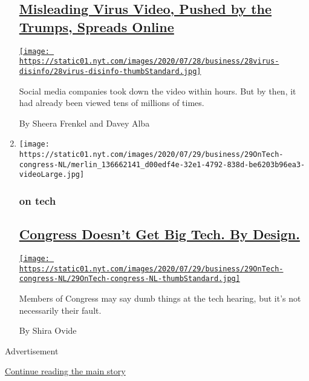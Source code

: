\begin{enumerate}
  \hypertarget{misleading-virus-video-pushed-by-the-trumps-spreads-online}{%
  \subsection{\texorpdfstring{\href{/2020/07/28/technology/virus-video-trump.html}{Misleading
  Virus Video, Pushed by the Trumps, Spreads
  Online}}{Misleading Virus Video, Pushed by the Trumps, Spreads Online}}\label{misleading-virus-video-pushed-by-the-trumps-spreads-online}}

  \href{/2020/07/28/technology/virus-video-trump.html}{\texttt{[image: https://static01.nyt.com/images/2020/07/28/business/28virus-disinfo/28virus-disinfo-thumbStandard.jpg]}}

  Social media companies took down the video within hours. But by then,
  it had already been viewed tens of millions of times.

  By Sheera Frenkel and Davey Alba
\item
  \texttt{[image: https://static01.nyt.com/images/2020/07/29/business/29OnTech-congress-NL/merlin\_136662141\_d00edf4e-32e1-4792-838d-be6203b96ea3-videoLarge.jpg]}

  \hypertarget{on-tech}{%
  \subsubsection{on tech}\label{on-tech}}

  \hypertarget{congress-doesnt-get-big-tech-by-design}{%
  \subsection{\texorpdfstring{\href{/2020/07/29/technology/congress-big-tech.html}{Congress
  Doesn't Get Big Tech. By
  Design.}}{Congress Doesn't Get Big Tech. By Design.}}\label{congress-doesnt-get-big-tech-by-design}}

  \href{/2020/07/29/technology/congress-big-tech.html}{\texttt{[image: https://static01.nyt.com/images/2020/07/29/business/29OnTech-congress-NL/29OnTech-congress-NL-thumbStandard.jpg]}}

  Members of Congress may say dumb things at the tech hearing, but it's
  not necessarily their fault.

  By Shira Ovide
\end{enumerate}

Advertisement

\protect\hyperlink{after-mid1}{Continue reading the main story}

